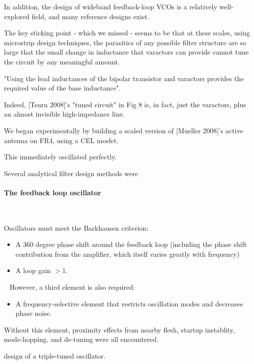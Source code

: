 \documentclass[fleqn,10pt]{article}
\begin{document}
\begin{multicols}{1}
In addition, the design of wideband feedback-loop VCOs is a relatively well-explored field, and many reference designs exist. 

The key sticking point - which we missed - seems to be that at these scales, using microstrip design techniques, the parasitics of any possible filter structure are so large that the small change in inductance that varactors can provide cannot tune the circuit by any meaningful amount.

"Using the lead inductances of the bipolar transistor and varactors provides the required value of the base inductance".

Indeed, [Tsuru 2008]'s "tuned circuit" in Fig 8 is, in fact, just the varactors, plus an almost invisible high-impedance line.

We began experimentally by building a scaled version of [Mueller 2008]'s active antenna on FR4, using a CEL mosfet.

This immediately oscillated perfectly.





Several analytical filter design methods were 


%
\paragraph{\textbf{The feedback loop oscillator}}\

Oscillators must meet the Barkhausen criterion:

\begin{itemize}

\item A 360 degree phase shift around the feedback loop (including the phase shift contribution from the amplifier, which itself varies greatly with frequency)
\item A loop gain $>1.$ 

\end{itemize}\
%
However, a third element is also required:
%
\begin{itemize}
\item A frequency-selective element that restricts oscillation modes and decreases phase noise.
\end{itemize}
%
Without this element, proximity effects from nearby flesh, startup instablity, mode-hopping, and de-tuning were all encountered. 



 design of a triple-tuned oscillator.



\end{multicols}
\end{document}
